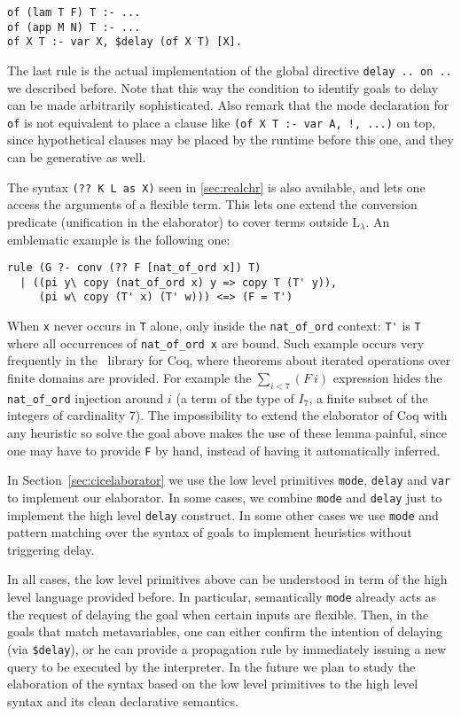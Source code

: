 \documentclass{easychair}
\begin{document}
\begin{Verbatim}
of (lam T F) T :- ...
of (app M N) T :- ...
of X T :- var X, $delay (of X T) [X].
\end{Verbatim}

The last rule is the actual implementation of the global directive
\verb+delay .. on ..+ we described before.  Note that this way the
condition to identify goals to delay can be made arbitrarily
sophisticated.
Also remark that the mode declaration for \verb+of+
is not equivalent to
place a clause like \verb+(of X T :- var A, !, ...)+
on top, 
since hypothetical clauses may be placed by the runtime before this one,
and they can be generative as well.

The syntax \verb+(?? K L as X)+ seen in \ref{sec:realchr} is also
available, and lets one access the arguments of a flexible term.
This lets one extend the conversion predicate (unification in the
elaborator) to cover terms outside L$_\lambda$.  An emblematic example is
the following one:

\begin{Verbatim}
rule (G ?- conv (?? F [nat_of_ord x]) T)
  | ((pi y\ copy (nat_of_ord x) y => copy T (T' y)),
     (pi w\ copy (T' x) (T' w))) <=> (F = T')
\end{Verbatim}

When \verb+x+ never occurs in \verb+T+ alone, only inside the
\verb+nat_of_ord+ context: \verb+T'+ is \verb+T+ where all occurrences
of \verb+nat_of_ord x+ are bound.  Such example occurs very frequently
in the~\cite{bigop} library for Coq, where theorems about iterated
operations over finite domains are provided.
For example the $\sum_{i < 7} (F~i)$ expression hides
the \verb+nat_of_ord+ injection around $i$ (a term of the
type of $I_7$, a finite subset of the integers of cardinality $7$).
The impossibility to extend the elaborator of Coq with any heuristic
so solve the goal above makes the use of these lemma painful, since
one may have to provide \verb+F+ by hand, instead of having it
automatically inferred.

In Section~\ref{sec:cicelaborator} we use the low level primitives \verb+mode+, \verb+delay+ and \verb+var+ to implement our elaborator. In some cases, we combine \verb+mode+ and \verb+delay+ just to implement the high level \verb+delay+ construct. In some other cases we use \verb+mode+ and pattern matching over the syntax of goals to implement heuristics without triggering delay. 

In all cases, the low level primitives above can be understood in term of the high level language provided before. In particular, semantically \verb+mode+ already acts as the request of delaying the goal when certain inputs are flexible. Then, in the goals that match metavariables, one can either confirm the intention of delaying (via \verb+$delay+), or he can provide a propagation rule by immediately issuing a new query to be executed by the interpreter. In the future we plan to study the elaboration of the syntax based on the low level primitives to the high level syntax and its clean declarative semantics.
\end{document}
